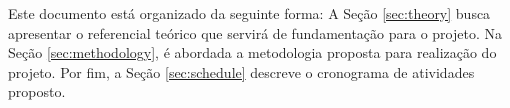 Este documento está organizado da seguinte forma: A Seção \ref{sec:theory} busca apresentar o referencial teórico que servirá de fundamentação para o projeto. Na Seção \ref{sec:methodology}, é abordada a metodologia proposta para realização do projeto. Por fim, a Seção \ref{sec:schedule} descreve o cronograma de atividades proposto.
